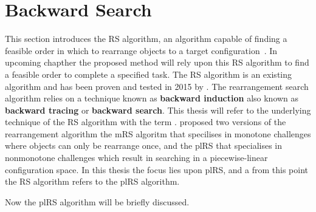 
\section{Backward Search}%
\label{sec:backward_search}
This section introduces the \ac{RS} algorithm, an algorithm capable of finding a feasible order in which to rearrange objects to a target configuration~\cite{krontiris_dealing_2015}. In upcoming chapther the proposed method will rely upon this \ac{RS} algorithm to find a feasible order to complete a specified task. The \ac{RS} algorithm is an existing algorithm and has been proven and tested in 2015 by \citeauthor{krontiris_dealing_2015}. The rearrangement search algorithm relies on a technique known as \textbf{backward induction} also known as \textbf{backward tracing} or \textbf{backward search}. This thesis will refer to the underlying technique of the \ac{RS} algorithm with the term . \citeauthor{krontiris_dealing_2015} proposed two versions of the rearrangement algorithm the \ac{mRS} algoritm that specilises in monotone challenges where objects can only be rearrange once, and the \ac{plRS} that specialises in nonmonotone challenges which result in searching in a piecewise-linear configuration space. In this thesis the focus lies upon \ac{plRS}, and a from this point the \ac{RS} algorithm refers to the \ac{plRS} algorithm.\bs

Now the \ac{plRS} algorithm will be briefly discussed. 
